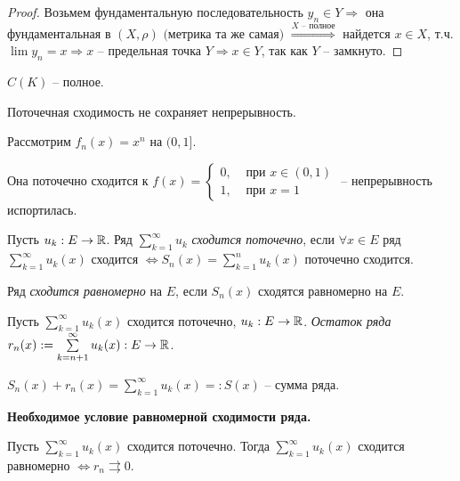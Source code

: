 \begin{proof}
    Возьмем фундаментальную последовательность $y_n\in Y\Rightarrow$ она фундаментальная в $(X, \rho)\text{  (метрика та же самая) }\overset{X \text{ – полное}}{\Rightarrow}$ найдется $x\in X$, т.ч. $ \lim y_n=x\Rightarrow x$ – предельная точка $Y\Rightarrow x\in Y$, так как $Y$ – замкнуто.
\end{proof}

\begin{corollary}
    $C(K)$ –  полное.
\end{corollary}

\begin{remark}
    Поточечная сходимость не сохраняет непрерывность.
\end{remark}

\begin{example}
    Рассмотрим $f_n(x)=x^n$ на $(0, 1]$.
    
    Она поточечно сходится к $f(x) =\left\{\begin{array}{ll} 0,&\text{ при } x\in (0, 1) \\ 1,&\text{ при } x=1
    \end{array}\right.$ – непрерывность испортилась.
\end{example}

\begin{definition}
    Пусть $u_k:E\rightarrow \mathbb{R}$. Ряд $\sum\limits_{k=1}^\infty u_k$ \textit{сходится поточечно}, если $\forall x\in E$ ряд $\sum\limits_{k=1}^\infty u_k(x)$ сходится $\Leftrightarrow S_n(x)=\sum\limits_{k=1}^n u_k(x)$ поточечно сходится.
\end{definition}

\begin{definition}
    Ряд \textit{сходится равномерно} на $E$, если $S_n(x)$ сходятся равномерно на $E$.
\end{definition}

\begin{definition}
    Пусть $\sum\limits_{k=1}^\infty u_k(x)$ сходится поточечно, $u_k:E\rightarrow \mathbb{R}$. \textit{Остаток ряда} $r_n(x):=\sum\limits_{k=n+1}^\infty u_k(x): E\rightarrow \mathbb{R}$.
\end{definition}

\begin{remark}
    $S_n(x)+r_n(x)=\sum\limits_{k=1}^\infty u_k(x)=:S(x)$ – сумма ряда.
\end{remark}

\begin{theorem}
    \textbf{Необходимое условие равномерной сходимости ряда.}

    Пусть $\sum\limits_{k=1}^\infty u_k(x)$ сходится поточечно. Тогда $\sum\limits_{k=1}^\infty u_k(x)$ сходится равномерно $\Leftrightarrow r_n\rightrightarrows 0$.
\end{theorem}

